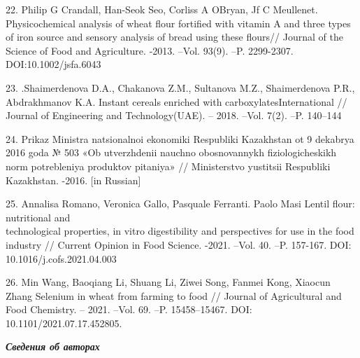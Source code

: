 \begin{noparindent}
22. Philip G Crandall, Han-Seok Seo, Corliss A O\textquotesingle Bryan,
Jf C Meullenet. Physicochemical analysis of wheat flour fortified with
vitamin A and three types of iron source and sensory analysis of bread
using these flours// Journal of the Science of Food and Agriculture.
-2013. --Vol. 93(9). --P. 2299-2307. \\DOI:10.1002/jsfa.6043

23. .Shaimerdenova D.A., Chakanova Z.M., Sultanova M.Z., Shaimerdenova
P.R., Abdrakhmanov K.A. Instant cereals enriched with
carboxylatesInternational // Journal of Engineering and Technology(UAE).
-- 2018. --Vol. 7(2). --P. 140--144

24. Prikaz Ministra natsional\textquotesingle noi ekonomiki Respubliki
Kazakhstan ot 9 dekabrya 2016 goda № 503 «Ob utverzhdenii nauchno
obosnovannykh fiziologicheskikh norm potrebleniya produktov pitaniya» //
Ministerstvo yustitsii Respubliki Kazakhstan. -2016. {[}in Russian{]}

25. Annalisa Romano, Veronica Gallo, Pasquale Ferranti. Paolo Masi
Lentil flour: nutritional and \\technological properties, in vitro
digestibility and perspectives for use in the food industry // Current
Opinion in Food Science. -2021. --Vol. 40. --P. 157-167. DOI:
10.1016/j.cofs.2021.04.003

26. Min Wang, Baoqiang Li, Shuang Li, Ziwei Song, Fanmei Kong, Xiaocun
Zhang Selenium in wheat from farming to food // Journal of Agricultural
and Food Chemistry. -- 2021. --Vol. 69. --P. 15458--15467. DOI:
10.1101/2021.07.17.452805.

\end{noparindent}

\emph{{\bfseries Сведения об авторах}}

